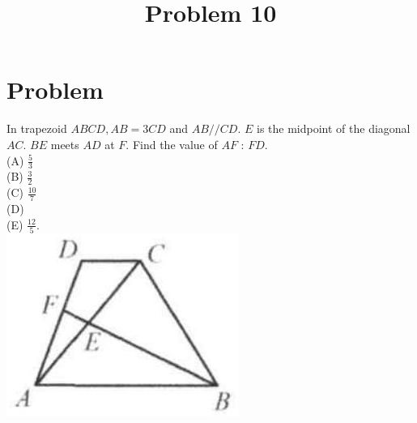 \documentclass{article}
\title{Problem 10}
\date{}
\begin{document}
\maketitle

\section*{Problem}
In trapezoid \(A B C D, A B=3 C D\) and \(A B / / C D\). \(E\) is the midpoint of the diagonal \(A C\). \(B E\) meets \(A D\) at \(F\). Find the value of \(A F\) : \(F D\).\\
(A) \(\frac{5}{3}\)\\
(B) \(\frac{3}{2}\)\\
(C) \(\frac{10}{7}\)\\
(D)\\
(E) \(\frac{12}{5}\).\\
\centering
\includegraphics[width=\textwidth]{images/128.jpg}
\end{document}
